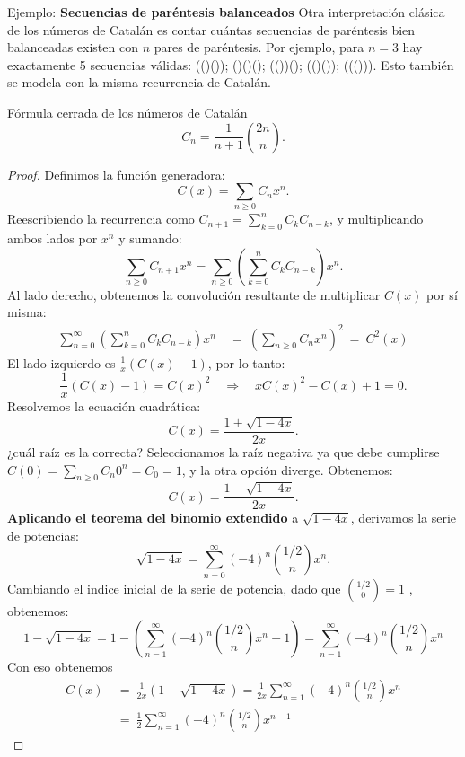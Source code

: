 \begin{exampleblock}{Ejemplo: \textbf{Secuencias de paréntesis balanceados}}
Otra interpretación clásica de los números de Catalán es contar cuántas secuencias de paréntesis bien balanceadas existen con $n$ pares de paréntesis. 
Por ejemplo, para $n = 3$ hay exactamente 5 secuencias válidas:
(()()); ()()(); (())(); (()()); ((())).
Esto también se modela con la misma recurrencia de Catalán.
\end{exampleblock}

\begin{thmblock}{Fórmula cerrada de los números de Catalán}
$$
C_n = \frac{1}{n+1} \binom{2n}{n}.
$$
\end{thmblock}
\begin{proof}
Definimos la función generadora:
$$
C(x) = \sum_{n \geq 0} C_n x^n.
$$
Reescribiendo la recurrencia como $C_{n+1} = \sum_{k=0}^{n} C_k C_{n-k}$, y multiplicando ambos lados por $x^n$ y sumando:
$$
\sum_{n \geq 0} C_{n+1} x^n = \sum_{n \geq 0} \left( \sum_{k=0}^{n} C_k C_{n-k} \right) x^n.
$$
 Al lado derecho, obtenemos la convolución resultante de multiplicar $C(x)$ por sí misma:
\begin{align*}
   \sum_{n=0}^{\infty}\left(\sum_{k=0}^{n}C_kC_{n-k}\right) x^n &~=~ 
   \left(\sum_{n\geq 0}{C_nx^n}\right)^2 ~=~ C^2(x)
\end{align*}  
El lado izquierdo es $\frac{1}{x}(C(x) - 1)$, por lo tanto:
$$
\frac{1}{x}(C(x) - 1) = C(x)^2 \quad \Rightarrow \quad xC(x)^2 - C(x) + 1 = 0.
$$
Resolvemos la ecuación cuadrática:
$$
C(x) = \frac{1 \pm \sqrt{1 - 4x}}{2x}.
$$
¿cuál raíz es la correcta? 
Seleccionamos la raíz negativa ya que debe cumplirse $C(0) = \sum_{n \geq 0} C_n 0^n =C_0 = 1$, y la otra opción diverge. Obtenemos:
$$
C(x) = \frac{1 - \sqrt{1 - 4x}}{2x}.
$$
\textbf{Aplicando el teorema del binomio extendido} a $\sqrt{1 - 4x}$, derivamos la serie de potencias:
$$
\sqrt{1 - 4x} = \sum_{n = 0}^{\infty} (-4)^n \binom{1/2}{n} x^n. 
$$
Cambiando el indice inicial de la serie de potencia, dado que $\binom{1/2}{0}=1$ , obtenemos:
$$
1 - \sqrt{1 - 4x} =1- \left(\sum_{n = 1}^{\infty} (-4)^n \binom{1/2}{n} x^n + 1\right) = \sum_{n = 1}^{\infty} (-4)^{n} \binom{1/2}{n} x^n
$$
Con eso obtenemos 
\begin{align*}    
C(x) &~=~ \frac{1}{2x}(1-\sqrt{1 - 4x})
=\frac{1}{2x}\sum_{n = 1}^{\infty} (-4)^{n} \binom{1/2}{n} x^n\\
&~=~ \frac{1}{2}\sum_{n = 1}^{\infty} (-4)^{n} \binom{1/2}{n} x^{n-1}

\end{align*}
\end{proof}
